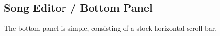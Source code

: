\subsection{Song Editor / Bottom Panel}
\label{subsec:song_editor_bottom}

   The bottom panel is simple, consisting of a stock horizontal scroll bar.

